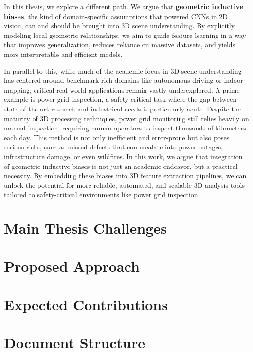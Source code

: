 %
In this thesis, we explore a different path. We argue that \textbf{geometric
    inductive biases}, the kind of domain-specific assumptions that powered CNNs in
2D vision, can and should be brought into 3D scene understanding. By explicitly
modeling local geometric relationships, we aim to guide feature learning in a
way that improves generalization, reduces reliance on massive datasets, and
yields more interpretable and efficient models.

In parallel to this, while much of the academic focus in 3D scene understanding
has centered around benchmark-rich domains like autonomous driving or indoor
mapping, critical real-world applications remain vastly underexplored.
%
A prime example is power grid inspection, a safety critical task where the gap
between state-of-the-art research and industrical needs is particularly acute.
%
Despite the maturity of 3D processing techniques, power grid monitoring still
relies heavily on manual inspection, requiring human operators to inspect
thousands of kilometers each day. This method is not only inefficient and
error-prone but also poses serious risks, such as missed defects that can
escalate into power outages, infrastructure damage, or even wildfires.
%
In this work, we argue that integration of geometric inductive biases is not
just an academic endeavor, but a practical necessity. By embedding these
biases into 3D feature extraction pipelines, we can unlock the potential for
more reliable, automated, and scalable 3D analysis tools tailored to
safety-critical environments like power grid inspection.

\section{Main Thesis Challenges}

\section{Proposed Approach}

\section{Expected Contributions}

\section{Document Structure}